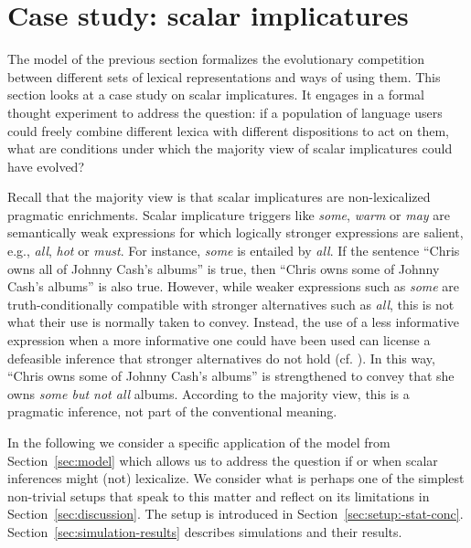 \documentclass[a4paper, 11pt]{article}
\theoremstyle{Satz}
\begin{document}
\section{Case study: scalar implicatures}
\label{sec:si-case-study}

The model of the previous section formalizes the evolutionary competition between different
sets of lexical representations and ways of using them. This section looks at a case study on
scalar implicatures. It engages in a formal thought experiment to address the
question: if a population of language users could freely combine different lexica with
different dispositions to act on them, what are conditions under which the majority view of scalar
implicatures could have evolved?

Recall that the majority view is that scalar implicatures are non-lexicalized pragmatic
enrichments. Scalar implicature triggers like \emph{some}, \emph{warm} or \emph{may} are
semantically weak expressions for which logically stronger expressions are salient, e.g.,
\emph{all}, \emph{hot} or \emph{must}. For instance, {\em some} is entailed by {\em all}. If
the sentence ``Chris owns all of Johnny Cash's albums'' is true, then ``Chris owns some of
Johnny Cash's albums'' is also true. However, while weaker expressions such as {\em some} are
truth-conditionally compatible with stronger alternatives such as {\em all}, this is not what
their use is normally taken to convey. Instead, the use of a less informative expression when a
more informative one could have been used can license a defeasible inference that stronger
alternatives do not hold (cf. \citealt{horn:1972,gazdar:1979}). In this way, ``Chris owns some
of Johnny Cash's albums'' is strengthened to convey that she owns {\em some but not all}
albums. According to the majority view, this is a pragmatic inference, not part of the
conventional meaning.

In the following we consider a specific application of the model from Section~\ref{sec:model}
which allows us to address the question if or when scalar inferences might (not) lexicalize. We
consider what is perhaps one of the simplest non-trivial setups that speak to this matter and
reflect on its limitations in Section~\ref{sec:discussion}. The setup is introduced in
Section~\ref{sec:setup:-stat-conc}. Section~\ref{sec:simulation-results} describes simulations
and their results.

\end{document}
